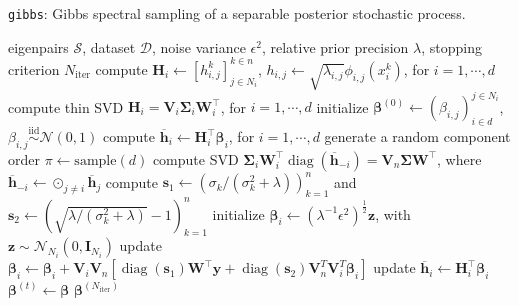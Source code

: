 \documentclass{article}
\DeclareMathOperator{\diag}{diag}
\begin{document}
\begin{algorithm}[h]
  \caption{\texttt{gibbs}: Gibbs spectral sampling of a separable posterior stochastic process.}
  \label{alg:gibbs}
  \begin{algorithmic}[1] %
    \Input eigenpairs $\mathcal{S}$, dataset $\mathcal{D}$,
    noise variance $\epsilon^2$, relative prior precision $\lambda$,
    stopping criterion $N_{\text{iter}}$
    \State compute $\mathbf{H}_i \gets [h_{i,j}^k]_{j \in N_i}^{k \in n}$,
    $h_{i,j} \gets \sqrt{\lambda_{i,j}} \phi_{i,j}(x^k_i)$, for $i = 1, \cdots, d$
    \State compute thin SVD $\mathbf{H}_i = \mathbf{V}_i \boldsymbol{\Sigma}_i \mathbf{W}_i^\intercal$,
    for $i = 1, \cdots, d$
    \State initialize $\boldsymbol{\beta}^{(0)} \gets (\beta_{i,j})_{i \in d}^{j \in N_i}$,
    $\beta_{i,j} \overset{\text{iid}}{\sim} \mathcal{N}(0, 1)$
    \State compute $\overline{\mathbf{h}}_i \gets \mathbf{H}_i^\intercal \boldsymbol{\beta}_i$,
    for $i = 1, \cdots, d$
      \State generate a random component order $\pi \gets \mathrm{sample}(d)$
        \State compute SVD
        $\boldsymbol{\Sigma}_i \mathbf{W}_i^\intercal \diag(\overline{\mathbf{h}}_{-i}) =
        \mathbf{V}_n \boldsymbol{\Sigma} \mathbf{W}^\intercal$,
        where $\overline{\mathbf{h}}_{-i} \gets \odot_{j \ne i} \overline{\mathbf{h}}_j$
        \State compute $\mathbf{s}_1 \gets (\sigma_k / (\sigma_k^2 + \lambda))_{k=1}^n$ and
        $\mathbf{s}_2 \gets (\sqrt{\lambda / (\sigma_k^2 + \lambda)} - 1)_{k=1}^n$
        \State initialize $\boldsymbol{\beta}_i \gets (\lambda^{-1} \epsilon^2)^{\frac{1}{2}} \mathbf{z}$,
        with $\mathbf{z} \sim \mathcal{N}_{N_i}(0, \mathbf{I}_{N_i})$
        \State update $\boldsymbol{\beta}_i \gets \boldsymbol{\beta}_i + \mathbf{V}_i \mathbf{V}_n
        [\diag(\mathbf{s}_1) \mathbf{W}^\intercal \mathbf{y} +
        \diag(\mathbf{s}_2) \mathbf{V}_n^T \mathbf{V}_i^T \boldsymbol{\beta}_i]$
        \State update $\overline{\mathbf{h}}_i \gets \mathbf{H}_i^\intercal \boldsymbol{\beta}_i$
      \EndFor
      \State $\boldsymbol{\beta}^{(t)} \gets \boldsymbol{\beta}$
    \EndFor
    \Output $\boldsymbol{\beta}^{(N_{\text{iter}})}$
  \end{algorithmic}
\end{algorithm}
\end{document}
